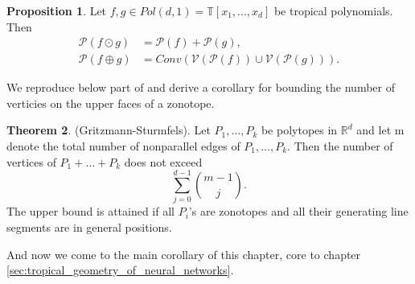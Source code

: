\documentclass{article}
\theoremstyle{definition}
\newtheorem{theorem}{Theorem}[section]
\newtheorem{proposition}[theorem]{Proposition}
\begin{document}
\begin{proposition} \cite[p.~4]{zhang2018tropical}
Let $f, g \in Pol(d, 1) = \mathbb{T}[x_1, \dots , x_d]$ be tropical polynomials. Then
\begin{align*}
\mathcal{P}(f \odot g) &= \mathcal{P}(f) + \mathcal{P}(g), \\
\mathcal{P}(f \oplus g) &= Conv(\mathcal{V}(\mathcal{P}(f)) \cup \mathcal{V}( \mathcal{P}(g))).
\end{align*}
\end{proposition}

We reproduce below part of \cite[Theorem 2.1.20]{gritzmann1993minkowski} and derive a corollary for bounding the number of verticies on the upper faces of a zonotope.

\begin{theorem}
\label{theo:gritzmann_sturmfels}
(Gritzmann-Sturmfels). Let $P_1, \dots , P_k$ be polytopes in $\mathbb{R}^{d}$ and let m denote the total number of nonparallel edges of $P_1, \dots , P_k$. Then the number of vertices of $P_1 + \dots + P_k$ does not exceed
$$\sum_{j=0}^{d-1} \binom{m-1}{j}.$$
The upper bound is attained if all $P_i$'s are zonotopes and all their generating line segments are in general positions. \cite{gritzmann1993minkowski}
\end{theorem}

And now we come to the main corollary of this chapter, core to chapter \ref{sec:tropical_geometry_of_neural_networks}.
\end{document}
